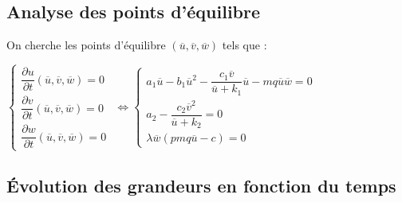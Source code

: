 \documentclass[a4paper, 11pt]{report}%
\begin{document}
        \subsection{Analyse des points d'équilibre}
        On cherche les points d'équilibre $  \left( \overline{u},  \overline{v}, \overline{w} \right)$ tels que : 
        \begin{center}
        $ \left\{
            \begin{array}{ll}
                \dfrac{\partial u}{\partial t} \left( \overline{u},  \overline{v}, \overline{w} \right) =0 \\
                \dfrac{\partial v}{\partial t} \left( \overline{u},  \overline{v}, \overline{w} \right) = 0\\
                \dfrac{\partial w}{\partial t}  \left( \overline{u},  \overline{v}, \overline{w} \right) = 0
            \end{array}
        \right.$
        $ \Leftrightarrow \left\{ 
        	\begin{array}{ll}
                a_1 \overline{u} - b_1 \overline{u}^2 - \dfrac{c_1 \overline{v}}{\overline{u} + k_1} \overline{u} - mq \overline{u} \overline{w} =0 \\
                a_2 - \dfrac{c_2 \overline{v}^2}{\overline{u} + k_2} = 0\\
                \lambda \overline{w} \left( pmq \overline{u} - c \right) = 0
            \end{array}
        \right.$
        \end{center}
        
        \subsection{Évolution des grandeurs en fonction du temps}
        
\end{document}
